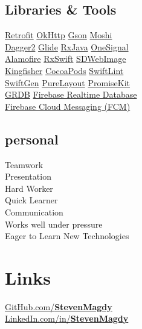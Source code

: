 \documentclass[]{Resume}
\begin{document}
\begin{minipage}[t]{0.33\textwidth}
\subsection{Libraries \& Tools}
\href{http://github.com/square/retrofit}{Retrofit} \textbullet{} \href{http://github.com/square/okhttp}{OkHttp} \textbullet{} \href{http://github.com/google/gson}{Gson} \textbullet{} \href{http://github.com/square/moshi}{Moshi} \textbullet{}\\
\href{http://github.com/google/dagger}{Dagger2} \textbullet{} \href{http://github.com/bumptech/glide}{Glide} \textbullet{} \href{http://github.com/ReactiveX/RxJava}{RxJava} \textbullet{} \href{http://onesignal.com/}{OneSignal}\\
\vspace{\topsep}
\href{http://github.com/Alamofire/Alamofire}{Alamofire} \textbullet{} \href{http://github.com/ReactiveX/RxSwift}{RxSwift} \textbullet{} \href{http://github.com/SDWebImage/SDWebImage}{SDWebImage} \textbullet{}\\ 
\href{http://github.com/onevcat/Kingfisher}{Kingfisher} \textbullet{} \href{http://cocoapods.org/}{CocoaPods} \textbullet{} \href{http://github.com/realm/SwiftLint}{SwiftLint} \textbullet{}\\
\href{http://github.com/SwiftGen/SwiftGen}{SwiftGen} \textbullet{} \href{http://github.com/PureLayout/PureLayout}{PureLayout} \textbullet{} \href{http://github.com/mxcl/PromiseKit}{PromiseKit} \textbullet{}\\
\href{http://github.com/groue/GRDB.swift}{GRDB} \textbullet{} \href{http://firebase.google.com/products/realtime-database}{Firebase Realtime Database} \textbullet{}\\
\href{http://firebase.google.com/products/cloud-messaging}{Firebase Cloud Messaging (FCM)}

\sectionsep

\subsection{personal}
Teamwork\\
Presentation\\
Hard Worker\\
Quick Learner\\
Communication\\
Works well under pressure\\
Eager to Learn New Technologies
\sectionsep


\section{Links} 
\href{http://github.com/stevenmagdy}{GitHub.com/\bf StevenMagdy}\\
\href{http://www.linkedin.com/in/StevenMagdy}{LinkedIn.com/in/\bf StevenMagdy}

%
%

\end{minipage} 
\end{document}
